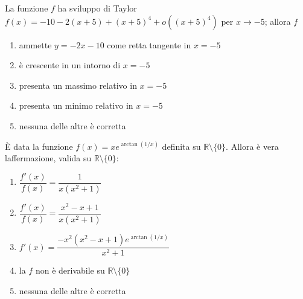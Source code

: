\begin{quiz}
La funzione $f$ ha sviluppo di Taylor $f(x)=-10-2(x+5)+(x+5)^4+o((x+5)^4)$ per $x\to-5$; allora $f$
\begin{enumerate}
\item ammette $y=-2x-10$ come retta tangente in $x=-5$
\item \`e crescente in un intorno di $x=-5$
\item presenta un massimo relativo in $x=-5$
\item presenta un minimo relativo in $x=-5$
\item nessuna delle altre \`e corretta
\end{enumerate}
\end{quiz}

\begin{quiz}
\`E data la funzione $f(x)=x e^{\arctan(1/x)}$ definita su $\mathbb R\setminus\{0\}$. Allora \`e vera l\textquotesingle affermazione, valida su $\mathbb R\setminus\{0\}$:
\begin{enumerate}
\item $\dfrac{f\prime(x)}{f(x)}=\dfrac1{x(x^2+1)}$
\item $\dfrac{f\prime(x)}{f(x)}=\dfrac{x^2-x+1}{x(x^2+1)}$
\item $f\prime(x)=\dfrac{-x^2(x^2-x+1)e^{\arctan(1/x)}}{x^2+1}$
\item la $f$ non \`e derivabile su $\mathbb R\setminus\{0\}$
\item nessuna delle altre \`e corretta
\end{enumerate}
\end{quiz}


